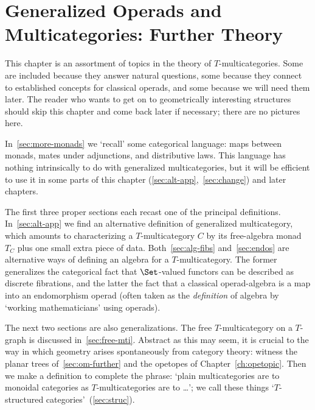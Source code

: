 
\chapter{Generalized Operads and Multicategories: Further Theory}



\noindent
This chapter is an assortment of topics in the theory of
$T$-multicategories.  Some are included because they answer natural
questions, some because they connect to established concepts for classical
operads, and some because we will need them later.  The reader who wants to
get on to geometrically interesting structures should skip this chapter and
come back later if necessary; there are no pictures here.

In~\ref{sec:more-monads} we `recall' some categorical language: maps
between monads, mates under adjunctions, and distributive laws.  This
language has nothing intrinsically to do with generalized multicategories,
but it will be efficient to use it in some parts of this chapter
(\ref{sec:alt-app},~\ref{sec:change}) and later chapters.  

The first three proper sections each recast one of the principal
definitions.  In~\ref{sec:alt-app} we find an alternative definition of
generalized multicategory, which amounts to characterizing a
$T$-multicategory $C$ by its free-algebra monad $T_C$ plus one small extra
piece of data.  Both~\ref{sec:alg-fibs} and~\ref{sec:endos} are
alternative ways of defining an algebra for a $T$-multicategory.  The
former generalizes the categorical fact that $\Set$-valued functors can be
described as discrete fibrations, and the latter the fact that a classical
operad-algebra is a map into an endomorphism operad (often taken as the
\emph{definition} of algebra by `working mathematicians' using operads).

The next two sections are also generalizations.  The free $T$-multicategory
on a $T$-graph is discussed in~\ref{sec:free-mti}.  Abstract as this may
seem, it is crucial to the way in which geometry arises spontaneously from
category theory: witness the planar trees of~\ref{sec:om-further} and the
opetopes of Chapter~\ref{ch:opetopic}.  Then we make a definition to
complete the phrase: `plain multicategories are to monoidal categories as
$T$-multicategories are to \ldots'; we call these things `$T$-structured
categories'~(\ref{sec:struc}).

